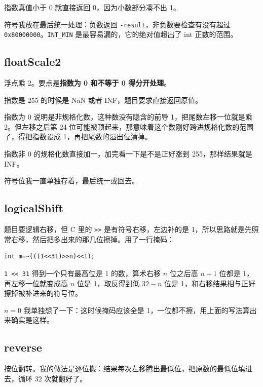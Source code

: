 \documentclass[11pt, a4paper]{ctexart}
\begin{document}
指数真值小于 0 就直接返回 0，因为小数部分凑不出 1。

符号我放在最后统一处理：负数返回 \texttt{-result}，非负数要检查有没有超过 \texttt{0x80000000}。\texttt{INT\_MIN} 是最容易漏的，它的绝对值超出了 int 正数的范围。

\subsection{floatScale2}

浮点乘 2。要点是\textbf{指数为 0 和不等于 0 得分开处理}。

指数是 255 的时候是 NaN 或者 INF，题目要求直接返回原值。

指数为 0 说明是非规格化数，这种数没有隐含的前导 1，把尾数左移一位就是乘 2。但左移之后第 24 位可能被顶起来，那意味着这个数刚好跨进规格化数的范围了，得把指数设成 1，再把尾数的溢出位清掉。

指数非 0 的规格化数直接加一，加完看一下是不是正好涨到 255，那样结果就是 INF。

符号位我一直单独存着，最后统一或回去。

\subsection{logicalShift}

题目要逻辑右移，但 C 里的 \texttt{>>} 是有符号右移，左边补的是 1，所以思路就是先照常右移，然后把多出来的那几位擦掉。用了一行掩码：

\begin{lstlisting}[style=c]
int m=~(((1<<31)>>n)<<1);
\end{lstlisting}

\texttt{1 << 31} 得到一个只有最高位是 1 的数，算术右移 $n$ 位之后高 $n+1$ 位都是 1，再左移一位就变成高 $n$ 位是 1，取反得到低 $32-n$ 位是 1，和右移结果相与正好擦掉被补进来的符号位。

$n = 0$ 我单独想了一下：这时候掩码应该全是 1，一位都不擦，用上面的写法算出来确实是这样。

\subsection{reverse}

按位翻转。我的做法是逐位搬：结果每次左移腾出最低位，把原数的最低位填进去，循环 32 次就翻好了。
\end{document}
